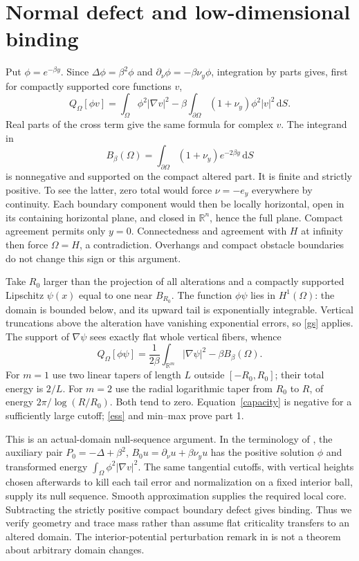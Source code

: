 \documentclass[11pt]{article}
\newcommand{\R}{\mathbb R}
\newcommand{\dd}{\,\mathrm d}
\begin{document}
\section{Normal defect and low-dimensional binding}
Put $\phi=e^{-\beta y}$. Since $\Delta\phi=\beta^2\phi$ and
$\partial_\nu\phi=-\beta\nu_y\phi$, integration by parts gives, first for
compactly supported core functions $v$,
\begin{equation}\label{gs}
 Q_\Omega[\phi v]=\int_\Omega\phi^2|\nabla v|^2
 -\beta\int_{\partial\Omega}(1+\nu_y)\phi^2|v|^2\dd S.
\end{equation}
Real parts of the cross term give the same formula for complex $v$.
The integrand in
\[
 B_\beta(\Omega)=\int_{\partial\Omega}(1+\nu_y)e^{-2\beta y}\dd S
\]
is nonnegative and supported on the compact altered part. It is finite and
strictly positive. To see the latter, zero total would force
$\nu=-e_y$ everywhere by continuity. Each boundary component would then be
locally horizontal, open in its containing horizontal plane, and closed in
$\R^n$, hence the full plane. Compact agreement permits only $y=0$.
Connectedness and agreement with $H$ at infinity then force $\Omega=H$,
a contradiction. Overhangs and compact obstacle boundaries do not change
this sign or this argument.

Take $R_0$ larger than the projection of all alterations and a compactly
supported Lipschitz $\psi(x)$ equal to one near $B_{R_0}$.
The function $\phi\psi$ lies in $H^1(\Omega)$: the domain is bounded below,
and its upward tail is exponentially integrable. Vertical truncations above
the alteration have vanishing exponential errors, so \eqref{gs} applies.
The support of $\nabla\psi$ sees exactly flat whole vertical fibers, whence
\begin{equation}\label{capacity}
 Q_\Omega[\phi\psi]=\frac1{2\beta}\int_{\R^m}|\nabla\psi|^2
                         -\beta B_\beta(\Omega).
\end{equation}
For $m=1$ use two linear tapers of length $L$ outside $[-R_0,R_0]$;
their total energy is $2/L$. For $m=2$ use the radial logarithmic taper from
$R_0$ to $R$, of energy $2\pi/\log(R/R_0)$. Both tend to zero.
Equation~\eqref{capacity} is negative for a sufficiently large cutoff;
\eqref{ess} and min--max prove part 1.

This is an actual-domain null-sequence argument. In the terminology of
\cite{PV}, the auxiliary pair $P_0=-\Delta+\beta^2$,
$B_0u=\partial_\nu u+\beta\nu_yu$ has the positive solution $\phi$ and
transformed energy $\int_\Omega\phi^2|\nabla v|^2$.
The same tangential cutoffs, with vertical heights chosen afterwards to kill
each tail error and normalization on a fixed interior ball, supply its null
sequence. Smooth approximation supplies the required local core.
Subtracting the strictly positive compact boundary defect gives binding.
Thus we verify geometry and trace mass rather than assume flat criticality
transfers to an altered domain. The interior-potential perturbation remark in
\cite[Remark 5.22]{PV} is not a theorem about arbitrary domain changes.
\end{document}
